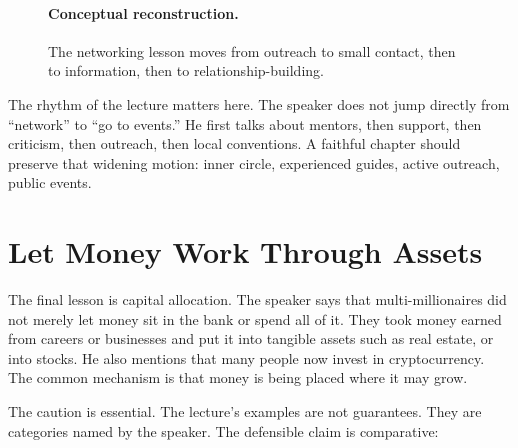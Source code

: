 \begin{figure}
\centering
{}

\paragraph{Conceptual reconstruction.}
The networking lesson moves from outreach to small contact, then to information, then to relationship-building.
\end{figure}

The rhythm of the lecture matters here. The speaker does not jump directly from ``network'' to ``go to events.'' He first talks about mentors, then support, then criticism, then outreach, then local conventions. A faithful chapter should preserve that widening motion: inner circle, experienced guides, active outreach, public events.

\section{Let Money Work Through Assets}

The final lesson is capital allocation. The speaker says that multi-millionaires did not merely let money sit in the bank or spend all of it. They took money earned from careers or businesses and put it into tangible assets such as real estate, or into stocks. He also mentions that many people now invest in cryptocurrency. The common mechanism is that money is being placed where it may grow.

The caution is essential. The lecture's examples are not guarantees. They are categories named by the speaker. The defensible claim is comparative:

